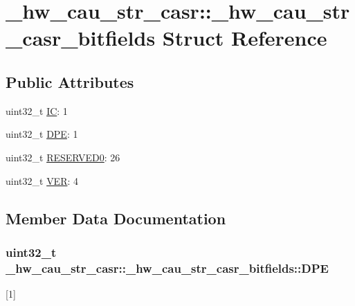 \hypertarget{struct__hw__cau__str__casr_1_1__hw__cau__str__casr__bitfields}{}\section{\+\_\+hw\+\_\+cau\+\_\+str\+\_\+casr\+:\+:\+\_\+hw\+\_\+cau\+\_\+str\+\_\+casr\+\_\+bitfields Struct Reference}
\label{struct__hw__cau__str__casr_1_1__hw__cau__str__casr__bitfields}
\subsection*{Public Attributes}
\begin{DoxyCompactItemize}
\item 
uint32\+\_\+t \hyperlink{struct__hw__cau__str__casr_1_1__hw__cau__str__casr__bitfields_a39ebaf34d3dba4a78b0df2eaa88ce610}{IC}\+: 1
\item 
uint32\+\_\+t \hyperlink{struct__hw__cau__str__casr_1_1__hw__cau__str__casr__bitfields_a9320abef2ff62ee55af7c646d411f568}{D\+PE}\+: 1
\item 
uint32\+\_\+t \hyperlink{struct__hw__cau__str__casr_1_1__hw__cau__str__casr__bitfields_a04be78412a81b4010824707cf7fe4bb1}{R\+E\+S\+E\+R\+V\+E\+D0}\+: 26
\item 
uint32\+\_\+t \hyperlink{struct__hw__cau__str__casr_1_1__hw__cau__str__casr__bitfields_a11af20eac76f8d950e0471f134908d1a}{V\+ER}\+: 4
\end{DoxyCompactItemize}


\subsection{Member Data Documentation}
\subsubsection[{\texorpdfstring{D\+PE}{DPE}}]{\setlength{\rightskip}{0pt plus 5cm}uint32\+\_\+t \+\_\+hw\+\_\+cau\+\_\+str\+\_\+casr\+::\+\_\+hw\+\_\+cau\+\_\+str\+\_\+casr\+\_\+bitfields\+::\+D\+PE}\hypertarget{struct__hw__cau__str__casr_1_1__hw__cau__str__casr__bitfields_a9320abef2ff62ee55af7c646d411f568}{}\label{struct__hw__cau__str__casr_1_1__hw__cau__str__casr__bitfields_a9320abef2ff62ee55af7c646d411f568}
\mbox{[}1\mbox{]} 
